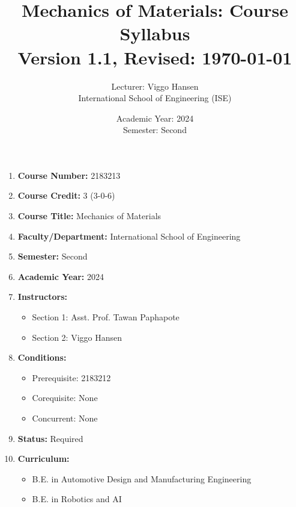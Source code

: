 \documentclass[12pt]{article}
\title{\textbf{Mechanics of Materials: Course Syllabus} \\ \small{Version 1.1, Revised: \today}}
\author{Lecturer: Viggo Hansen\\
International School of Engineering (ISE)}
\date{Academic Year: 2024 \\ Semester: Second}
\begin{document}
\maketitle

{
\hypersetup{linkcolor=black} %
\tableofcontents
}

\newcommand{\documentversion}{Version 1.1}
\newcommand{\documentdate}{\today}

\pagestyle{fancy}
\fancyhf{}
\fancyhead[L]{\documentversion}
\fancyhead[R]{\documentdate}
\renewcommand{\headrulewidth}{0.4pt}
\renewcommand{\footrulewidth}{0.4pt}

\begin{enumerate}
    \item \textbf{Course Number:} 2183213
    \item \textbf{Course Credit:} 3 (3-0-6)
    \item \textbf{Course Title:} Mechanics of Materials
    \item \textbf{Faculty/Department:} International School of Engineering
    \item \textbf{Semester:} Second
    \item \textbf{Academic Year:} 2024
    \item \textbf{Instructors:}
        \begin{itemize}
            \item Section 1: Asst. Prof. Tawan Paphapote
            \item Section 2: Viggo Hansen
        \end{itemize}
    \item \textbf{Conditions:}
        \begin{itemize}
            \item Prerequisite: 2183212
            \item Corequisite: None
            \item Concurrent: None
        \end{itemize}
    \item \textbf{Status:} Required
    \item \textbf{Curriculum:}
        \begin{itemize}
            \item B.E. in Automotive Design and Manufacturing Engineering
            \item B.E. in Robotics and AI

\end{itemize}
\end{enumerate}
\end{document}
